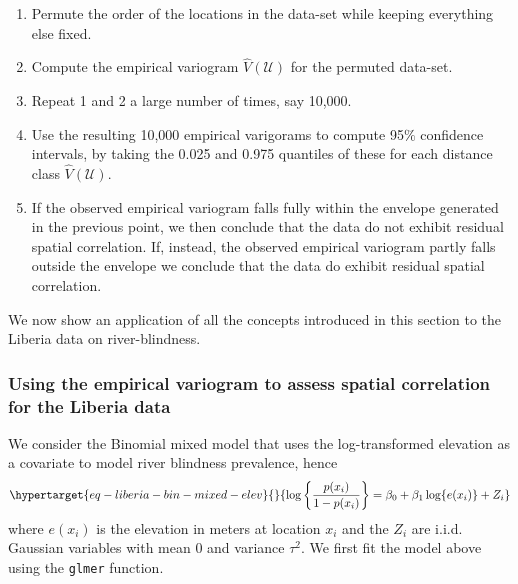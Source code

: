 \documentclass[
  letterpaper,
]{krantz}
\begin{document}
\begin{enumerate}
\def\labelenumi{\arabic{enumi}.}
\item
  Permute the order of the locations in the data-set while keeping
  everything else fixed.
\item
  Compute the empirical variogram \(\hat{V}(\mathcal{U})\) for the
  permuted data-set.
\item
  Repeat 1 and 2 a large number of times, say 10,000.
\item
  Use the resulting 10,000 empirical varigorams to compute 95\(\%\)
  confidence intervals, by taking the 0.025 and 0.975 quantiles of these
  for each distance class \(\hat{V}(\mathcal{U})\).
\item
  If the observed empirical variogram falls fully within the envelope
  generated in the previous point, we then conclude that the data do not
  exhibit residual spatial correlation. If, instead, the observed
  empirical variogram partly falls outside the envelope we conclude that
  the data do exhibit residual spatial correlation.
\end{enumerate}

We now show an application of all the concepts introduced in this
section to the Liberia data on river-blindness.

\hypertarget{sec-empirical-variog}{%
\subsubsection{Using the empirical variogram to assess spatial
correlation for the Liberia data}\label{sec-empirical-variog}}

We consider the Binomial mixed model that uses the log-transformed
elevation as a covariate to model river blindness prevalence, hence
\begin{equation}\protect\hypertarget{eq-liberia-bin-mixed-elev}{}{
\log\left\{\frac{p(x_i)}{1-p(x_i)}\right\} = \beta_{0} + \beta_{1}\log\{e(x_i)\} + Z_i
}\label{eq-liberia-bin-mixed-elev}\end{equation} where \(e(x_i)\) is the
elevation in meters at location \(x_i\) and the \(Z_i\) are i.i.d.
Gaussian variables with mean 0 and variance \(\tau^2\). We first fit the
model above using the \texttt{glmer} function.
\end{document}
